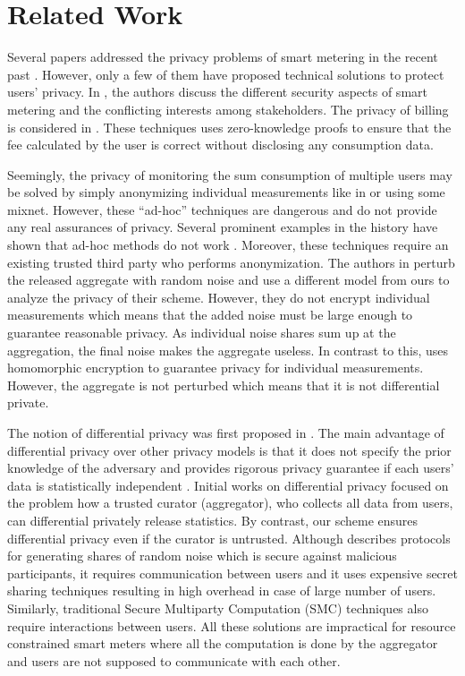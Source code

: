\documentclass[11pt,a4paper]{article}
\theoremstyle{plain}
\theoremstyle{plain}
\theoremstyle{plain}
\theoremstyle{plain}
\theoremstyle{nonumberplain} \theoremseparator{}
\begin{document}
\section{Related Work}

Several papers addressed the privacy problems of smart metering in the recent past \cite{kalogridis10smartgridcommA,Molina10buildsys,anderson10weis,anderson10key,anderson10smartgridcomm,bohli10icc,danezis10tc,garcia10stm}. However, only a few of them have proposed technical solutions to protect users' privacy. 
In \cite{anderson10weis,anderson10smartgridcomm}, the authors discuss the different security aspects of smart metering and the conflicting interests among stakeholders. 
The privacy of billing is considered in \cite{danezis10tc,Molina10buildsys}. These techniques uses zero-knowledge proofs to ensure that the fee calculated by the user is correct without disclosing any consumption data.   

Seemingly, the privacy of monitoring the sum consumption of multiple users may be solved by simply anonymizing individual measurements like in \cite{kalogridis10smartgridcommA} or using some mixnet. However, these ``ad-hoc'' techniques are dangerous and do not provide any real assurances of privacy. Several prominent examples in the history have shown that ad-hoc methods do not work \cite{korolova09www}. Moreover, 
these techniques require an existing trusted third party who performs anonymization.    
The authors in \cite{bohli10icc} perturb the released aggregate with random noise and use a different model from ours to analyze the privacy of their scheme. However, they do not encrypt individual measurements which means that the added noise must be large enough to guarantee reasonable privacy. As individual noise shares sum up at the aggregation, the final noise makes the aggregate useless.  
In contrast to this, \cite{garcia10stm} uses homomorphic encryption to guarantee privacy for individual measurements. However, the aggregate is not perturbed which means that it is not differential private. 

The notion of differential privacy was first proposed in \cite{dwork06tcc}. 
The main advantage of differential privacy over other privacy models is that it does not specify the prior knowledge of the adversary and provides rigorous privacy guarantee if each users' data is statistically independent \cite{kifer11sigmod}.
Initial works on differential privacy focused on the problem how a trusted curator (aggregator), who
collects all data from users, can differential privately release statistics. By contrast,
our scheme ensures differential privacy even if the curator is untrusted. 
Although \cite{dwork06eurocrypt} describes protocols for generating shares of random noise which is secure against malicious participants, it requires communication between users and it uses expensive secret sharing techniques resulting in high overhead in case of large number of users. 
Similarly, traditional Secure Multiparty Computation (SMC)
techniques \cite{GoldreichMulitParty} \cite{Cramer01eurocrypt} also require interactions between users. All these solutions are impractical for resource constrained smart meters where all the computation is done by the aggregator and users are not supposed to communicate with each other.
\end{document}
